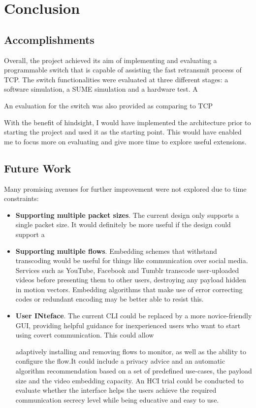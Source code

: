 \chapter{Conclusion}
\section{Accomplishments}
Overall, the project achieved its aim of implementing and evaluating a programmable switch that is capable of assisting the fast retransmit process of TCP. The switch functionalities were evaluated at three different stages: a software simulation, a SUME simulation and a hardware test. A

An evaluation for the switch was also provided as comparing to TCP 

With the benefit of hindsight, I would have implemented the architecture prior to starting the project and used it as the starting point. This would have enabled me to focus more on evaluating and give more time to explore useful extensions.

\section{Future Work}

Many promising avenues for further improvement were not explored due to time constraints:

\begin{itemize}
	\item \textbf{Supporting multiple packet sizes}. The current design only supports a single packet size. It would definitely be more useful if the design could support a 
	
	\item \textbf{Supporting multiple flows}. Embedding schemes that withstand transcoding would be useful for things like communication over social media. Services such as YouTube, Facebook and Tumblr transcode user-uploaded videos before presenting them to other users, destroying any payload hidden in motion vectors. Embedding algorithms that make use of error correcting codes or redundant encoding may be better able to resist this.
	
	\item \textbf{User INteface}. The current CLI could be replaced by a more novice-friendly GUI, providing helpful guidance for inexperienced users who want to start using covert communication. This could allow
	
	adaptively installing and removing flows to monitor, as well as the ability to configure the flow.It could include a privacy advice and an automatic algorithm recommendation based on a set of predefined use-cases, the payload size and the video embedding capacity. An HCI trial could be conducted to evaluate whether the interface helps the users achieve the required communication secrecy level while being educative and easy to use.
	
\end{itemize}

